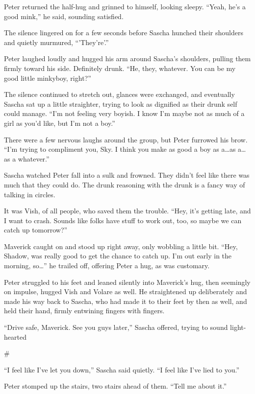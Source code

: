 \documentclass[12pt,letterpaper,oneside]{memoir}
\newcommand\secdiv{
  \begin{center}
    \#
  \end{center}
}
\begin{document}
  Peter returned the half-hug and grinned to himself, looking sleepy. ``Yeah, he's a good mink,'' he said, sounding satisfied.

  The silence lingered on for a few seconds before Sascha hunched their shoulders and quietly murmured, ``'They're'.''

  Peter laughed loudly and hugged his arm around Sascha's shoulders, pulling them firmly toward his side. Definitely drunk. ``He, they, whatever. You can be my good little minkyboy, right?''

  The silence continued to stretch out, glances were exchanged, and eventually Sascha sat up a little straighter, trying to look as dignified as their drunk self could manage. ``I'm not feeling very boyish. I know I'm maybe not as much of a girl as you'd like, but I'm not a boy.''

  There were a few nervous laughs around the group, but Peter furrowed his brow. ``I'm trying to compliment you, Sky. I think you make as good a boy as a\ldots{}as a\ldots{}as a whatever.''

  Sascha watched Peter fall into a sulk and frowned. They didn't feel like there was much that they could do. The drunk reasoning with the drunk is a fancy way of talking in circles.

  It was Vish, of all people, who saved them the trouble. ``Hey, it's getting late, and I want to crash. Sounds like folks have stuff to work out, too, so maybe we can catch up tomorrow?''

  Maverick caught on and stood up right away, only wobbling a little bit. ``Hey, Shadow, was really good to get the chance to catch up. I'm out early in the morning, so\ldots{}'' he trailed off, offering Peter a hug, as was customary.

  Peter struggled to his feet and leaned silently into Maverick's hug, then seemingly on impulse, hugged Vish and Volare as well. He straightened up deliberately and made his way back to Sascha, who had made it to their feet by then as well, and held their hand, firmly entwining fingers with fingers.

  ``Drive safe, Maverick. See you guys later,'' Sascha offered, trying to sound light-hearted

  \secdiv

  ``I feel like I've let you down,'' Sascha said quietly. ``I feel like I've lied to you.''

  Peter stomped up the stairs, two stairs ahead of them. ``Tell me about it.''
\end{document}
